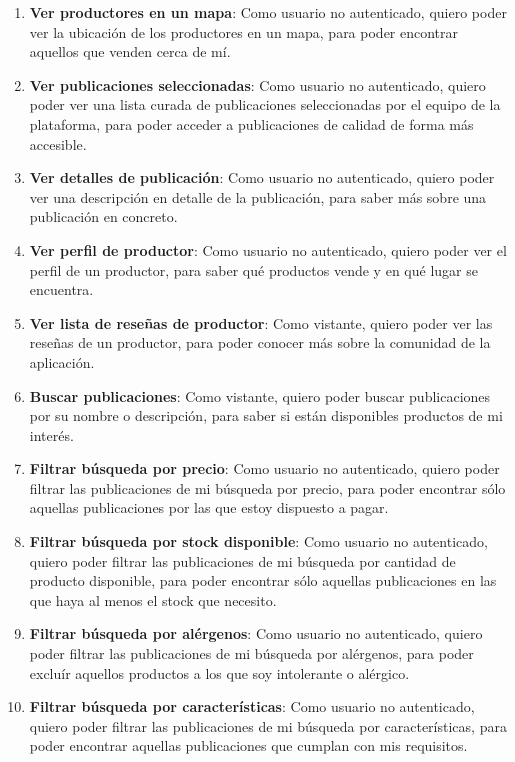 \begin{enumerate}[label=HU-\protect\twodigits{\arabic*}:, align=left, leftmargin=*]
\item \textbf{Ver productores en un mapa}: Como usuario no autenticado, quiero poder ver la ubicación de los productores en un mapa, para poder encontrar aquellos que venden cerca de mí.

\item \textbf{Ver publicaciones seleccionadas}: Como usuario no autenticado, quiero poder ver una lista curada de publicaciones seleccionadas por el equipo de la plataforma, para poder acceder a publicaciones de calidad de forma más accesible.

\item \textbf{Ver detalles de publicación}: Como usuario no autenticado, quiero poder ver una descripción en detalle de la publicación, para saber más sobre una publicación en concreto.

\item \textbf{Ver perfil de productor}: Como usuario no autenticado, quiero poder ver el perfil de un productor, para saber qué productos vende y en qué lugar se encuentra.

\item \textbf{Ver lista de reseñas de productor}: Como vistante, quiero poder ver las reseñas de un productor, para poder conocer más sobre la comunidad de la aplicación.

\item \textbf{Buscar publicaciones}: Como vistante, quiero poder buscar publicaciones por su nombre o descripción, para saber si están disponibles productos de mi interés.

\item \textbf{Filtrar búsqueda por precio}: Como usuario no autenticado, quiero poder filtrar las publicaciones de mi búsqueda por precio, para poder encontrar sólo aquellas publicaciones por las que estoy dispuesto a pagar.

\item \textbf{Filtrar búsqueda por stock disponible}: Como usuario no autenticado, quiero poder filtrar las publicaciones de mi búsqueda por cantidad de producto disponible, para poder encontrar sólo aquellas publicaciones en las que haya al menos el stock que necesito.

\item \textbf{Filtrar búsqueda por alérgenos}: Como usuario no autenticado, quiero poder filtrar las publicaciones de mi búsqueda por alérgenos, para poder excluír aquellos productos a los que soy intolerante o alérgico.

\item \textbf{Filtrar búsqueda por características}: Como usuario no autenticado, quiero poder filtrar las publicaciones de mi búsqueda por características, para poder encontrar aquellas publicaciones que cumplan con mis requisitos.


\end{enumerate}
